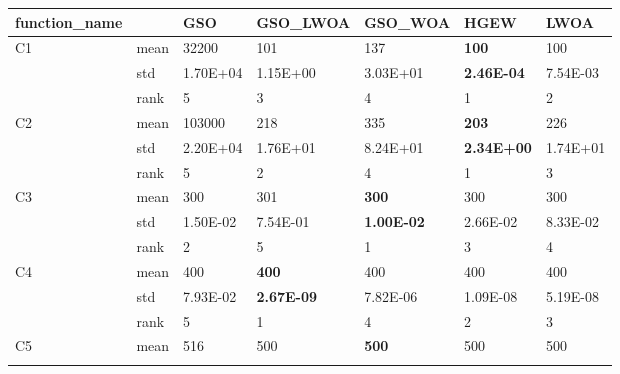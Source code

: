 \begin{table}[]
\centering
\begin{tabular}{|l|l|l|l|l|l|l|}
\hline
function\_name       &      & GSO      & GSO\_LWOA         & GSO\_WOA          & HGEW              & LWOA              \\ \hline
\multirow{3}{*}{C1}  & mean & 32200    & 101               & 137               & \textbf{100}      & 100               \\ \cline{2-7} 
                     & std  & 1.70E+04 & 1.15E+00          & 3.03E+01          & \textbf{2.46E-04} & 7.54E-03          \\ \cline{2-7} 
                     & rank & 5        & 3                 & 4                 & 1                 & 2                 \\ \hline
\multirow{3}{*}{C2}  & mean & 103000   & 218               & 335               & \textbf{203}      & 226               \\ \cline{2-7} 
                     & std  & 2.20E+04 & 1.76E+01          & 8.24E+01          & \textbf{2.34E+00} & 1.74E+01          \\ \cline{2-7} 
                     & rank & 5        & 2                 & 4                 & 1                 & 3                 \\ \hline
\multirow{3}{*}{C3}  & mean & 300      & 301               & \textbf{300}      & 300               & 300               \\ \cline{2-7} 
                     & std  & 1.50E-02 & 7.54E-01          & \textbf{1.00E-02} & 2.66E-02          & 8.33E-02          \\ \cline{2-7} 
                     & rank & 2        & 5                 & 1                 & 3                 & 4                 \\ \hline
\multirow{3}{*}{C4}  & mean & 400      & \textbf{400}      & 400               & 400               & 400               \\ \cline{2-7} 
                     & std  & 7.93E-02 & \textbf{2.67E-09} & 7.82E-06          & 1.09E-08          & 5.19E-08          \\ \cline{2-7} 
                     & rank & 5        & 1                 & 4                 & 2                 & 3                 \\ \hline
\multirow{3}{*}{C5}  & mean & 516      & 500               & \textbf{500}      & 500               & 500               \\ \cline{2-7} 

\end{tabular}
\end{table}
